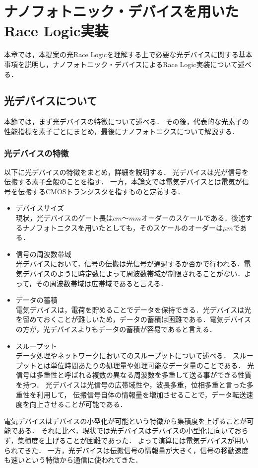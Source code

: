 \chapter{ナノフォトニック・デバイスを用いたRace Logic実装}
本章では，本提案の光Race Logicを理解する上で必要な光デバイスに関する基本事項を説明し，ナノフォトニック・デバイスによるRace Logic実装について述べる．

\section{光デバイスについて}
本節では，まず光デバイスの特徴について述べる．
その後，代表的な光素子の性能指標を素子ごとにまとめ，最後にナノフォトニクスについて解説する．

\subsection{光デバイスの特徴}
以下に光デバイスの特徴をまとめ，詳細を説明する．
光デバイスは光が信号を伝搬する素子全般のことを指す．
一方，本論文では電気デバイスとは電気が信号を伝搬するCMOSトランジスタを指すものと定義する．
\begin{itemize}
\item デバイスサイズ\\
現状，光デバイスのゲート長は$cm$〜$mm$オーダーのスケールである．後述するナノフォトニクスを用いたとしても，そのスケールのオーダーは$\mu m$である．
\item 信号の周波数帯域\\
光デバイスにおいて，信号の伝搬は光信号が通過するか否かで行われる．電気デバイスのように時定数によって周波数帯域が制限されることがない．よって，その周波数帯域は広帯域であると言える．
\item データの蓄積\\
電気デバイスは，電荷を貯めることでデータを保持できる．光デバイスは光を留めておくことが難しいため，データの蓄積は困難である．電気デバイスの方が，光デバイスよりもデータの蓄積が容易であると言える．
\item スループット\\
データ処理やネットワークにおいてのスループットについて述べる．
スループットとは単位時間あたりの処理量や処理可能なデータ量のことである．
光信号は多重性と呼ばれる複数の異なる周波数を多重して送る事ができる性質を持つ．
光デバイスは光信号の広帯域性や，波長多重，位相多重と言った多重性を利用して，
伝搬信号自体の情報量を増加させることで，データ転送速度を向上させることが可能である．
\end{itemize}
電気デバイスはデバイスの小型化が可能という特徴から集積度を上げることが可能である．
それに比べ，現状では光デバイスはデバイスの小型化に向いておらず，集積度を上げることが困難であった．
よって演算には電気デバイスが用いられてきた．
一方，光デバイスは伝搬信号の情報量が大きく，信号の移動速度も速いという特徴から通信に使われてきた．

